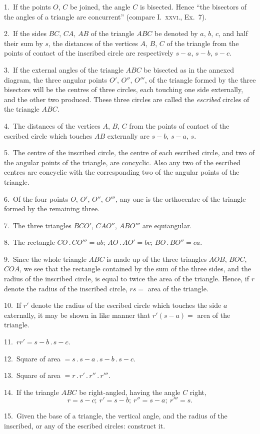 \documentclass[oneside]{book}
\begin{document}
\begin{footnotesize}
1.~If the points $O$, $C$ be joined, the angle $C$ is bisected.
Hence ``the bisectors of the angles of a triangle are concurrent''
(compare I.~\textsc{xxvi.}, Ex.~7).

2.~If the sides $BC$, $CA$, $AB$ of the triangle $ABC$ be denoted by
$a$, $b$, $c$, and half their sum by $s$, the distances of the vertices
$A$, $B$, $C$ of the triangle from the points of contact of the inscribed
circle are respectively $s-a$, $s-b$, $s-c$.



3.~If the external angles of the triangle $ABC$ be bisected as in
the annexed diagram, the three
angular points $O'$, $O''$, $O'''$, of
the triangle formed by the three
bisectors will be the centres of
three circles, each touching one
side externally, and the other
two produced. These three
circles are called the \emph{escribed}
circles of the triangle $ABC$.

4.~The distances of the vertices
$A$, $B$, $C$ from the points
of contact of the escribed circle
which touches $AB$ externally
are $s-b$, $s-a$, $s$.

5.~The centre of the inscribed
circle, the centre of each
escribed circle, and two of the
angular points of the triangle,
are concyclic. Also any two of the escribed centres are concyclic
with the corresponding two of the angular points of the triangle.

6.~Of the four points $O$, $O'$, $O''$, $O'''$, any one is the orthocentre
of the triangle formed by the remaining three.

7.~The three triangles $BCO'$, $CAO''$, $ABO'''$ are equiangular.

8.~The rectangle $CO\,.\,CO''' = ab$; $AO\,.\,AO' = bc$; $BO\,.\,BO''
= ca$.

9.~Since the whole triangle $ABC$ is made up of the three triangles
$AOB$, $BOC$, $COA$, we see that the rectangle contained by
the sum of the three sides, and the radius of the inscribed circle,
is equal to twice the area of the triangle. Hence, if $r$ denote the
radius of the inscribed circle, $rs =$ area of the triangle.

10.~If $r'$ denote the radius of the escribed circle which touches
the side $a$ externally, it may be shown in like manner that
$r'(s-a) =$ area of the triangle.

11.~$rr' = s-b\,.\,s-c$.

12.~Square of area $= s\,.\,s-a\,.\,s-b\,.\,s-c$.

13.~Square of area $= r\,.\,r'\,.\,r''\,.\,r'''$.

14.~If the triangle $ABC$ be right-angled, having the angle $C$
right,
\[
r = s-c;\ r' = s-b;\ r'' = s-a;\ r''' = s.
\]

15.~Given the base of a triangle, the vertical angle, and the
radius of the inscribed, or any of the escribed circles: construct
it.
\par\end{footnotesize}
\end{document}
